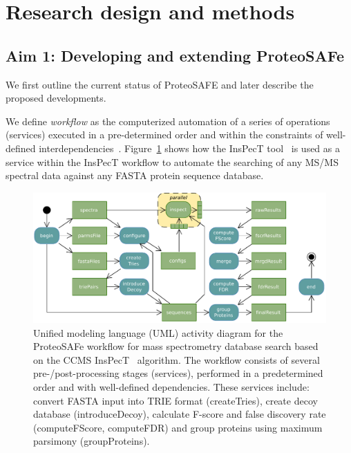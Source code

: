 \documentclass[arial,11pt]{article}
\newcommand{\SF}[1]{\textsf{#1}}
\newcommand{\SYSTEM}[0]{\SF{ProteoSAFe}\xspace}
\begin{document}
\section{Research design and methods}

\subsection{Aim 1: Developing and extending ProteoSAFe}

We first outline the current status of ProteoSAFE and later describe the proposed developments.

We define {\em workflow} as the computerized automation of a series of operations (services) executed in a pre-determined order and within the constraints of well-defined interdependencies~\cite{wfms:1995,wfms:1999}. Figure~\ref{fig:ex-workflow} shows how the InsPecT tool~\cite{Tanner:2005} is used as a service within the InsPecT workflow to automate the searching of any MS/MS spectral data against any FASTA protein sequence database.

\begin{figure}[ht!]
  \centering
  \includegraphics[width=16cm]{figures/inspect.pdf}
  \caption{\footnotesize Unified modeling language (UML) activity diagram for the \SYSTEM workflow for mass spectrometry database search based on the CCMS InsPecT~\cite{Tanner:2005} algorithm.  The workflow consists of several pre-/post-processing stages (services), performed in a predetermined order and with well-defined dependencies. These services include: convert FASTA input into TRIE format (\SF{createTries}), create decoy database (\SF{introduceDecoy}), calculate F-score and false discovery rate (\SF{computeFScore}, \SF{computeFDR}) and group proteins using maximum parsimony (\SF{groupProteins}).}
  \label{fig:ex-workflow}
\end{figure}
\end{document}
